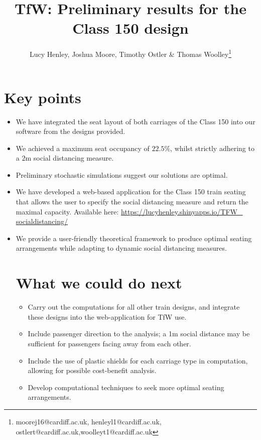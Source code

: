 \documentclass[11pt,a4paper]{article}
\title{TfW: Preliminary results for the Class 150 design}
\author{Lucy Henley, Joshua Moore, Timothy Ostler \& Thomas Woolley\footnote{moorej16@cardiff.ac.uk, henleyl1@cardiff.ac.uk, ostlert@cardiff.ac.uk,woolleyt1@cardiff.ac.uk}}
\begin{document}
\maketitle

\section*{Key points}
\begin{itemize}

\item We have integrated the seat layout of both carriages of the Class 150 into our software from the designs provided.
\item We achieved a maximum seat occupancy of $22.5\%$, whilst strictly adhering to a $2$m social distancing measure. 
\item Preliminary stochastic simulations suggest our solutions are optimal.
\item We have developed a web-based application for the Class 150 train seating that allows the user to specify the social distancing measure and return the maximal capacity. Available here: \href{https://lucyhenley.shinyapps.io/TFW_socialdistancing/}{https://lucyhenley.shinyapps.io/TFW\_ socialdistancing/}
\item We provide a user-friendly theoretical framework to produce optimal seating arrangements while adapting to dynamic social distancing measures.


\section*{What we could do next}
\begin{itemize}

\item Carry out the computations for all other train designs, and integrate these designs into the web-application for TfW use.
\item Include passenger direction to the analysis; a 1m social distance may be sufficient for passengers facing away from each other.
\item Include the use of plastic shields for each carriage type in computation, allowing for possible cost-benefit analysis.
\item Develop computational techniques to seek more optimal seating arrangements.

\end{itemize}




\end{itemize}
\end{document}
